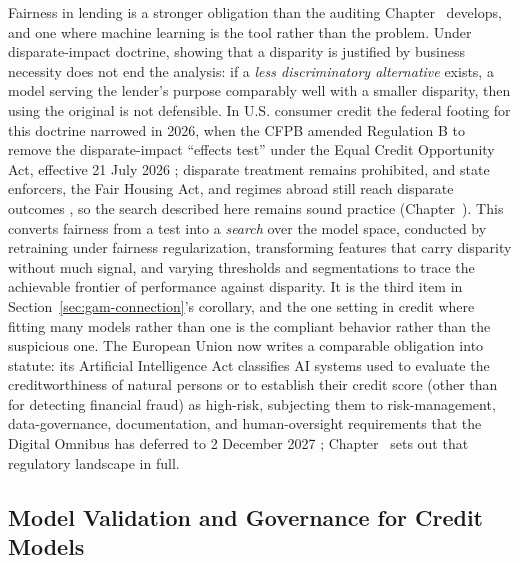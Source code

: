 \documentclass[../ai_in_finance]{subfiles}
\begin{document}
Fairness in lending is a stronger obligation than the auditing Chapter~ develops, and one where machine learning is the tool rather than the problem. Under disparate-impact doctrine, showing that a disparity is justified by business necessity does not end the analysis: if a \emph{less discriminatory alternative} exists, a model serving the lender's purpose comparably well with a smaller disparity, then using the original is not defensible. In U.S. consumer credit the federal footing for this doctrine narrowed in 2026, when the CFPB amended Regulation B to remove the disparate-impact ``effects test'' under the Equal Credit Opportunity Act, effective 21 July 2026 \parencite{cfpb2026regb}; disparate treatment remains prohibited, and state enforcers, the Fair Housing Act, and regimes abroad still reach disparate outcomes \parencite{massag2025earnest}, so the search described here remains sound practice (Chapter~). This converts fairness from a test into a \emph{search} over the model space, conducted by retraining under fairness regularization, transforming features that carry disparity without much signal, and varying thresholds and segmentations to trace the achievable frontier of performance against disparity. It is the third item in Section~\ref{sec:gam-connection}'s corollary, and the one setting in credit where fitting many models rather than one is the compliant behavior rather than the suspicious one. The European Union now writes a comparable obligation into statute: its Artificial Intelligence Act classifies AI systems used to evaluate the creditworthiness of natural persons or to establish their credit score (other than for detecting financial fraud) as high-risk, subjecting them to risk-management, data-governance, documentation, and human-oversight requirements \parencite{eu2024aiact} that the Digital Omnibus has deferred to 2 December 2027 \parencite{eu2026omnibus}; Chapter~ sets out that regulatory landscape in full.

\subsection{Model Validation and Governance for Credit Models}
\label{sec:credit-model-governance}
\end{document}
